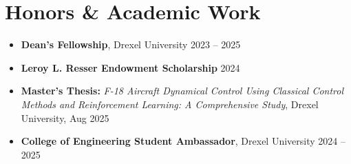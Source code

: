 \documentclass[10pt,letterpaper]{article}
\begin{document}
\section{Honors \& Academic Work}

\begin{itemize}[leftmargin=1.15em, itemsep=0.14em, topsep=0.15em]
    \item \textbf{Dean's Fellowship}, Drexel University \hfill 2023 -- 2025
    \item \textbf{Leroy L. Resser Endowment Scholarship} \hfill 2024
    \item \textbf{Master's Thesis:} \textit{F-18 Aircraft Dynamical Control Using Classical Control Methods and Reinforcement Learning: A Comprehensive Study}, Drexel University, Aug 2025
    \item \textbf{College of Engineering Student Ambassador}, Drexel University \hfill 2024 -- 2025
\end{itemize}
\end{document}
